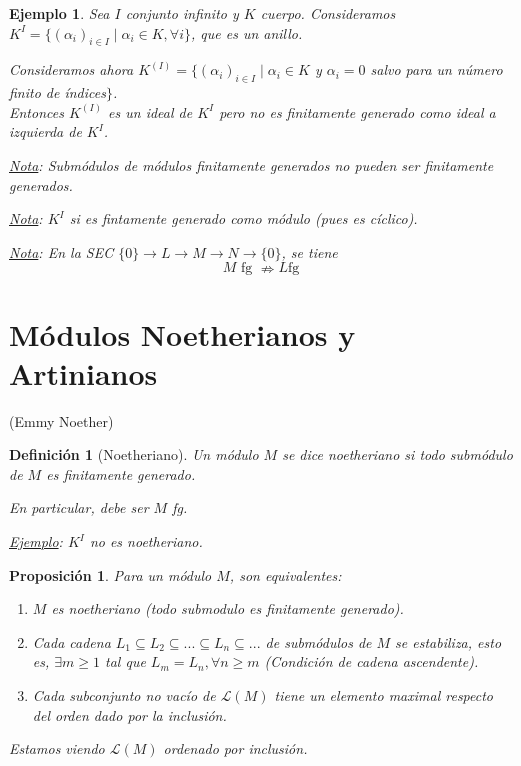 \documentclass[11pt,a4paper]{article}
\newcommand*{\circled}[2][]{\tikz[baseline=(C.base)]{
	\node[inner sep=0pt] (C) {\vphantom{1g}#2};
	\node[draw, circle, inner sep=1pt, yshift=1pt]
		at (C.center) {\vphantom{1g}};}}
\theoremstyle{break}
\newtheorem{example}[theorem]{Ejemplo}
\newtheorem{definition}[theorem]{Definición}
\newtheorem{proposition}[theorem]{Proposición}
\begin{document}
\begin{example}
Sea $I$ conjunto infinito y $K$ cuerpo. Consideramos $K^{I} = \{(\alpha_{i})_{i \in I} \mid \alpha_{i} \in K, \forall i\}$, que es un anillo.

Consideramos ahora $K^{(I)} = \{(\alpha_{i})_{i \in I} \mid \alpha_{i} \in K$ y $\alpha_{i} = 0$ salvo para un número finito de índices$\}$. \\
Entonces $K^{(I)}$ es un ideal de $K^{I}$ pero no es finitamente generado como ideal a izquierda de $K^{I}$.

\underline{Nota}: \circled{$\Rightarrow$} Submódulos de módulos finitamente generados no pueden ser finitamente generados.

\underline{Nota}: $K^{I}$ si es fintamente generado como módulo (pues es cíclico).

\underline{Nota}: En la SEC $\{0\} \to L \to M \to N \to \{0\}$, se tiene
$$M \text{ fg } \nRightarrow L \text {fg}$$
\end{example}

\newpage

\section{Módulos Noetherianos y Artinianos}

(Emmy Noether)

\begin{definition}[Noetheriano]
Un módulo $M$ se dice noetheriano si todo submódulo de $M$ es finitamente generado.

En particular, debe ser $M$ fg.

\underline{Ejemplo}: $K^{I}$ no es noetheriano.
\end{definition}


\begin{proposition}
Para un módulo $M$, son equivalentes:
\begin{enumerate}
\item $M$ es noetheriano (todo submodulo es finitamente generado).
\item Cada cadena $L_{1} \subseteq L_{2} \subseteq ... \subseteq L_{n} \subseteq ...$ de submódulos de $M$ se estabiliza, esto es, $\exists m \geq 1$ tal que $L_{m} = L_{n}, \forall n \geq m$ (Condición de cadena ascendente).
\item Cada subconjunto no vacío de $\mathcal{L}(M)$ tiene un elemento maximal respecto del orden dado por la inclusión.
\end{enumerate}

Estamos viendo $\mathcal{L}(M)$ ordenado por inclusión.
\end{proposition}
\end{document}
